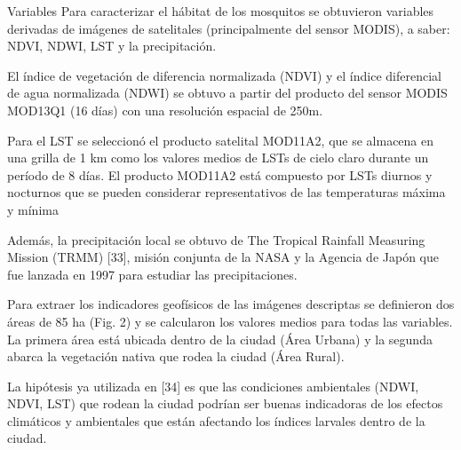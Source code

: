\documentclass[10pt]{beamer}
\begin{document}
\begin{frame}{Variables}
Para caracterizar el hábitat de los mosquitos se obtuvieron variables derivadas
de imágenes de satelitales (principalmente del sensor MODIS), a saber: NDVI,
NDWI, LST y la precipitación.

El índice de vegetación de diferencia normalizada (NDVI) y el índice diferencial
de agua normalizada (NDWI) se obtuvo a partir del producto del sensor MODIS
MOD13Q1 (16 días) con una resolución espacial de 250m.

Para el LST se seleccionó el producto satelital MOD11A2, que se almacena en una
grilla de 1 km como los valores medios de LSTs de cielo claro durante un período
de 8 días. El producto MOD11A2 está compuesto por LSTs diurnos y nocturnos que
se pueden considerar representativos de las temperaturas máxima y mínima

Además, la precipitación local se obtuvo de The Tropical Rainfall Measuring
Mission (TRMM) [33], misión conjunta de la NASA y la Agencia de Japón que fue
lanzada en 1997 para estudiar las precipitaciones.


Para extraer los indicadores geofísicos de las imágenes descriptas se definieron
dos áreas de 85 ha (Fig. 2) y se calcularon los valores medios para todas las
variables. La primera área está ubicada dentro de la ciudad (Área Urbana) y la
segunda abarca la vegetación nativa que rodea la ciudad (Área Rural).

La hipótesis ya utilizada en [34] es que las condiciones ambientales (NDWI,
NDVI, LST) que rodean la ciudad podrían ser buenas indicadoras de los efectos
climáticos y ambientales que están afectando los índices larvales dentro de la
ciudad.

\end{frame}
\end{document}
